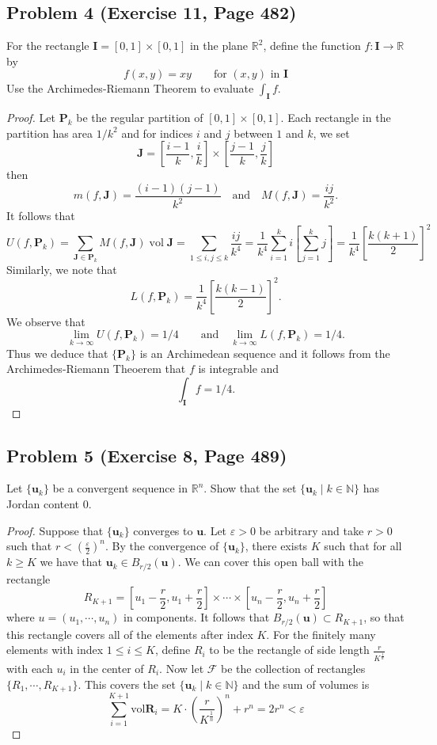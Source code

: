 \documentclass{article}
\DeclareMathOperator{\vol}{vol}
\renewcommand{\bf}[1]{\mathbf{#1}}
\begin{document}
\subsection*{Problem 4 (Exercise 11, Page 482)}
For the rectangle $\textbf{I} = [0, 1] \times [0, 1]$ in the plane $\mathbb{R}^2$, define the function $f \colon \textbf{I} \to \mathbb{R}$ by
\[ f(x, y) = xy \qquad \text{for $(x, y)$ in $\textbf{I}$}\]
Use the Archimedes-Riemann Theorem to evaluate $\int_{\textbf{I}} f$.
\begin{proof}
Let $\bf{P}_k$ be the regular partition of $[0,1] \times [0, 1]$. Each rectangle in the partition has area $1/k^2$ and for indices $i$ and $j$ between $1$ and $k$, we set \[\bf{J} = \left[\frac{i-1}{k},\frac{i}{k}\right] \times \left[\frac{j-1}{k},\frac{j}{k}\right]\] then \[m(f,\bf{J}) = \frac{(i-1)(j-1)}{k^2} \quad \text{and}\quad M(f,\bf{J}) = \frac{ij}{k^2}.\] It follows that
      \[ U(f,\bf{P}_k) = \sum_{\bf{J}\in\bf{P}_k} M(f,\bf{J}) \vol \bf{J} = \sum_{1\leq i, j \leq k} \frac{ij}{k^4} = \frac{1}{k^4} \sum_{i=1}^k i \left[\sum_{j=1}^k j\right] = \frac{1}{k^4} \left[\frac{k(k+1)}{2}\right]^2 \]
      Similarly, we note that \[L(f,\bf{P}_k) = \frac{1}{k^4} \left[\frac{k(k-1)}{2}\right]^2.\] We observe that \[\lim_{k\to\infty} U(f,\bf{P}_k) = 1/4 \qquad \text{and}\quad \lim_{k\to\infty} L(f,\bf{P}_k) = 1/4.\] Thus we deduce that $\{\bf{P}_k\}$ is an Archimedean sequence and it follows from the Archimedes-Riemann Theoerem that $f$ is integrable and \[\int_{\bf{I}} f = 1/4.\]
\end{proof}


\subsection*{Problem 5 (Exercise 8, Page 489)}
Let $\{\textbf{u}_k\}$ be a convergent sequence in $\mathbb{R}^n$. Show that the set $\{\textbf{u}_k \mid k \in \mathbb{N}\}$ has Jordan content 0.
\begin{proof}
Suppose that $\{\textbf{u}_k\}$ converges to $\textbf{u}$. Let $\varepsilon > 0$ be arbitrary and take $r>0$ such that $r < \left(\frac{\varepsilon}{2}\right)^n$. By the convergence of $\{\textbf{u}_k\}$, there exists $K$ such that for all $k \geq K$ we have that $\textbf{u}_k \in B_{r/2}(\textbf{u})$. We can cover this open ball with the rectangle 
\[ R_{K+1} = \left[u_1 - \frac{r}{2}, u_1 + \frac{r}{2}\right] \times \cdots \times \left[u_n - \frac{r}{2}, u_n + \frac{r}{2}\right]\]
where $u = (u_1, \cdots, u_n)$ in components. It follows that $B_{r/2}(\textbf{u}) \subset R_{K+1}$, so that this rectangle covers all of the elements after index $K$. For the finitely many elements with index $1 \leq i \leq K$, define $R_i$ to be the rectangle of side length $\frac{r}{K^\frac{1}{n}}$ with each $u_i$ in the center of $R_i$. Now let $\mathcal{F}$ be the collection of rectangles $\{R_1, \cdots, R_{K+1}\}$. This covers the set $\{\textbf{u}_k \mid k \in \mathbb{N}\}$ and the sum of volumes is 
\[ \sum_{i = 1}^{K+1} \text{vol} \textbf{R}_i = K \cdot (\frac{r}{K^{\frac{1}{n}}})^n + r^n = 2r^n < \varepsilon\]
\end{proof}
\end{document}
